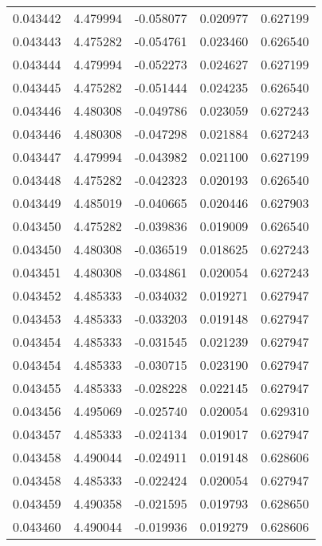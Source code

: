 \begin{tabular}{lrrrr}
0.043442    &  4.479994 & -0.058077 &  0.020977 &             0.627199 \\
0.043443    &  4.475282 & -0.054761 &  0.023460 &             0.626540 \\
0.043444    &  4.479994 & -0.052273 &  0.024627 &             0.627199 \\
0.043445    &  4.475282 & -0.051444 &  0.024235 &             0.626540 \\
0.043446    &  4.480308 & -0.049786 &  0.023059 &             0.627243 \\
0.043446    &  4.480308 & -0.047298 &  0.021884 &             0.627243 \\
0.043447    &  4.479994 & -0.043982 &  0.021100 &             0.627199 \\
0.043448    &  4.475282 & -0.042323 &  0.020193 &             0.626540 \\
0.043449    &  4.485019 & -0.040665 &  0.020446 &             0.627903 \\
0.043450    &  4.475282 & -0.039836 &  0.019009 &             0.626540 \\
0.043450    &  4.480308 & -0.036519 &  0.018625 &             0.627243 \\
0.043451    &  4.480308 & -0.034861 &  0.020054 &             0.627243 \\
0.043452    &  4.485333 & -0.034032 &  0.019271 &             0.627947 \\
0.043453    &  4.485333 & -0.033203 &  0.019148 &             0.627947 \\
0.043454    &  4.485333 & -0.031545 &  0.021239 &             0.627947 \\
0.043454    &  4.485333 & -0.030715 &  0.023190 &             0.627947 \\
0.043455    &  4.485333 & -0.028228 &  0.022145 &             0.627947 \\
0.043456    &  4.495069 & -0.025740 &  0.020054 &             0.629310 \\
0.043457    &  4.485333 & -0.024134 &  0.019017 &             0.627947 \\
0.043458    &  4.490044 & -0.024911 &  0.019148 &             0.628606 \\
0.043458    &  4.485333 & -0.022424 &  0.020054 &             0.627947 \\
0.043459    &  4.490358 & -0.021595 &  0.019793 &             0.628650 \\
0.043460    &  4.490044 & -0.019936 &  0.019279 &             0.628606 \\

\end{tabular}

